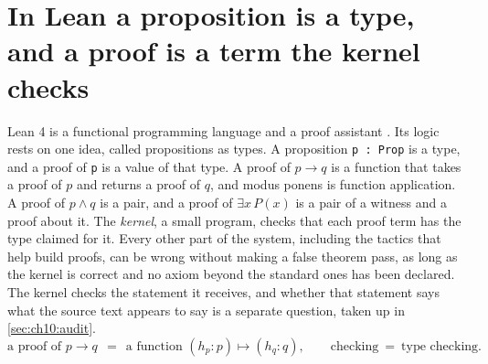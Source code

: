 
\section{In Lean a proposition is a type, and a proof is a term the kernel checks}\label{sec:ch10:lean}

Lean 4 is a functional programming language and a proof assistant \citep{demoura2021}. Its logic rests on one idea, called propositions as types. A proposition \texttt{p : Prop} is a type, and a proof of \texttt{p} is a value of that type. A proof of $p\to q$ is a function that takes a proof of $p$ and returns a proof of $q$, and modus ponens is function application. A proof of $p\wedge q$ is a pair, and a proof of $\exists x\,P(x)$ is a pair of a witness and a proof about it. The \emph{kernel}, a small program, checks that each proof term has the type claimed for it. Every other part of the system, including the tactics that help build proofs, can be wrong without making a false theorem pass, as long as the kernel is correct and no axiom beyond the standard ones has been declared. The kernel checks the statement it receives, and whether that statement says what the source text appears to say is a separate question, taken up in \cref{sec:ch10:audit}.
\begin{equation}
\text{a proof of } p\to q\ \ =\ \ \text{a function } (h_p : p)\mapsto(h_q : q),\qquad \text{checking}\ =\ \text{type checking}.
\label{eq:ch10:curryhoward}
\end{equation}

